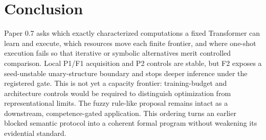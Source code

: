 \documentclass[10pt]{article}
\begin{document}
\section{Conclusion}
Paper 0.7 asks which exactly characterized computations a fixed Transformer can learn and execute, which resources move each finite frontier, and where one-shot execution fails so that iterative or symbolic alternatives merit controlled comparison. Local P1/F1 acquisition and P2 controls are stable, but F2 exposes a seed-unstable unary-structure boundary and stops deeper inference under the registered gate. This is not yet a capacity frontier: training-budget and architecture controls would be required to distinguish optimization from representational limits. The fuzzy rule-like proposal remains intact as a downstream, competence-gated application. This ordering turns an earlier blocked semantic protocol into a coherent formal program without weakening its evidential standard.
\end{document}
